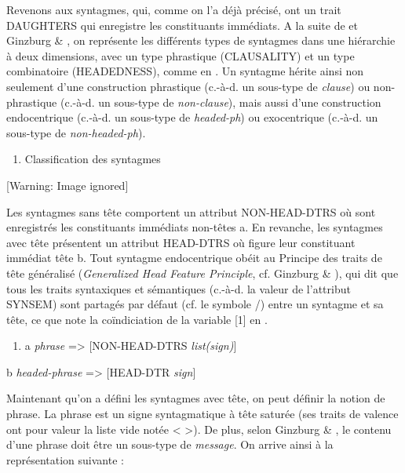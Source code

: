 Revenons aux syntagmes, qui, comme on l'a déjà précisé, ont un trait DAUGHTERS qui enregistre les constituants immédiats. A la suite de \citet{Sag1997} et Ginzburg \& \citet{Sag2000}, on représente les différents types de syntagmes dans une hiérarchie à deux dimensions, avec un type phrastique (CLAUSALITY) et un type combinatoire (HEADEDNESS), comme en . Un syntagme hérite ainsi non seulement d'une construction phrastique (c.-à-d. un sous-type de \textit{clause}) ou non-phrastique (c.-à-d. un sous-type de \textit{non-clause}), mais aussi d'une construction endocentrique (c.-à-d. un sous-type de \textit{headed-ph}) ou exocentrique (c.-à-d. un sous-type de \textit{non-headed-ph}).  


\begin{enumerate}
\item \label{bkm:Ref290391771}Classification des syntagmes


\end{enumerate}
{   [Warning: Image ignored] %
} 

Les syntagmes sans tête comportent un attribut NON-HEAD-DTRS où sont enregistrés les constituants immédiats non-têtes a. En revanche, les syntagmes avec tête présentent un attribut HEAD-DTRS où figure leur constituant immédiat tête b. Tout syntagme endocentrique obéit au Principe des traits de tête généralisé (\textit{Generalized Head Feature Principle}, cf. Ginzburg \& \citet{Sag2000}), qui dit que tous les traits syntaxiques et sémantiques (c.-à-d. la valeur de l'attribut SYNSEM) sont partagés par défaut (cf. le symbole /) entre un syntagme et sa tête, ce que note la coïndiciation de la variable [1] en .


\begin{enumerate}
\item \label{bkm:Ref290396507}a  \textit{phrase} ={\textgreater} [NON-HEAD-DTRS \textit{list(sign)}]  


\end{enumerate}
  b  \textit{headed-phrase} ={\textgreater} [HEAD-DTR \textit{sign}]

Maintenant qu'on a défini les syntagmes avec tête, on peut définir la notion de phrase. La phrase est un signe syntagmatique à tête saturée (ses traits de valence ont pour valeur la liste vide notée {\textless} {\textgreater}). De plus, selon Ginzburg \& \citet{Sag2000}, le contenu d'une phrase doit être un sous-type de \textit{message}. On arrive ainsi à la représentation suivante :


